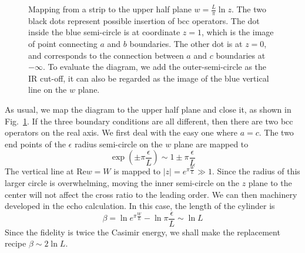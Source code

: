 \documentclass{article}
\begin{document}
\begin{figure}[h]
\centering
{}
\caption{Mapping from a strip to the upper half plane $w = \frac{L}{\pi} \ln z $. The two black dots represent possible insertion of bcc operators. The dot inside the blue semi-circle is at coordinate $z = 1$, which is the image of point connecting $a$ and $b$ boundaries. The other dot is at $z = 0$, and corresponds to the connection between $a$ and $c$ boundaries at $- \infty$. To evaluate the diagram, we add the outer-semi-circle as the IR cut-off, it can also be regarded as the image of the blue vertical line on the $w$ plane.}
\label{fig:fidel-map}
\end{figure}



As usual, we map the diagram to the upper half plane and close it, as shown in Fig.~\ref{fig:fidel-map}. If the three boundary conditions are all different, then there are two bcc operators on the real axis. We first deal with the easy one where $a = c$. The two end points of the $\epsilon$ radius semi-circle on the $w$ plane are mapped to
\begin{equation}
\exp( \pm \pi \frac{\epsilon}{ L}  ) \sim 1 \pm \pi \frac{\epsilon}{L} 
\end{equation}
The vertical line at $\text{Re} w = W$ is mapped to $|z| = e^{\pi \frac{W}{L} } \gg 1 $. Since the radius of this larger circle is overwhelming, moving the inner semi-circle on the $z$ plane to the center will not affect the cross ratio to the leading order. We can then machinery developed in the echo calculation. In this case, the length of the cylinder is
\begin{equation}
\beta = \ln e^{\pi \frac{W}{L}} - \ln \pi \frac{\epsilon}{L}  \sim \ln L 
\end{equation}
Since the fidelity is twice the Casimir energy, we shall make the replacement recipe $\beta \sim 2 \ln L$. 
\end{document}
